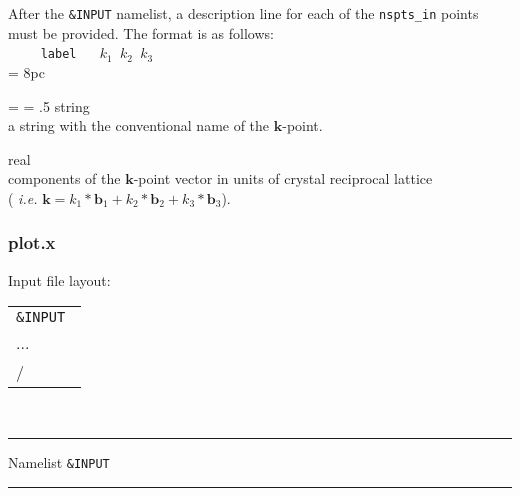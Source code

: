 \noindent After the {\tt \&INPUT} namelist, a description line for each of the 
{\tt nspts\_in} points must be provided. The format is as follows:\\

\noindent $\qquad$ \texttt{label} $\quad$ {\tt $k_1$ $k_2$ $k_3$ } \\

\newdimen\descindent \descindent = 8pc
{\noindent \leftskip = \descindent \parskip = .5\baselineskip
{}%
{\sc string} \\ a string with the conventional name of the $\mathbf{k}$-point. \par

\noindent{}%
{\sc real} \\ components of the $\mathbf{k}$-point vector in units of crystal reciprocal
              lattice \\
              ( {\it i.e.} $ \mathbf{k} = k_1 * \mathbf{b}_1 + k_2 * \mathbf{b}_2 + 
              k_3 * \mathbf{b}_3 $). \par
}\bigskip

\subsubsection{plot.x}
\noindent Input file layout: \\

%
%
\begin{tabular}{l}
  {\tt \&INPUT } \\
  ... \\
  / \\
\end{tabular}
%
%
\\

\begin{centering}
\rule{2.2in}{0.01in} Namelist {\tt \&INPUT} \rule{2.2in}{0.01in}
\end{centering}\\

